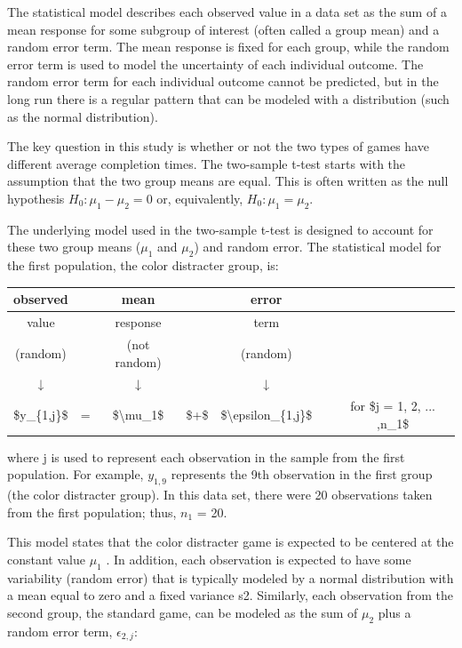 \documentclass[
]{report}
\begin{document}
The statistical model describes each observed value in a data set as the sum of a mean response for some subgroup of interest (often called a group mean) and a random error term. The mean response is fixed for each group, while the random error term is used to model the uncertainty of each individual outcome. The random error term for each individual outcome cannot be predicted, but in the long run there is a regular pattern that can be modeled with a distribution (such as the normal distribution).

The key question in this study is whether or not the two types of games have different average completion times. The two-sample t-test starts with the assumption that the two group means are equal. This is often written as the null hypothesis \(H_0 : \mu_1 - \mu_2 = 0\) or, equivalently, \(H_0 : \mu_1 = \mu_2\).

The underlying model used in the two-sample t-test is designed to account for these two group means (\(\mu_1\) and \(\mu_2\)) and random error. The statistical model for the first population, the color distracter group, is:

\begin{table}
\centering
\begin{tabular}{>{}c|>{}c|>{}c|>{}c|>{}c|>{}c|>{}c}
\hline
observed &  & mean &  & error &  & \\
\hline
value &  & response &  & term &  & \\
\hline
(random) &  & (not random) &  & (random) &  & \\
\hline
↓ &  & ↓ &  & ↓ &  & \\
\hline
\$y\_\{1,j\}\$ & = & \$\textbackslash{}mu\_1\$ & \$+\$ & \$\textbackslash{}epsilon\_\{1,j\}\$ &  & for \$j = 1, 2, ... ,n\_1\$\\
\hline
\end{tabular}
\end{table}

where j is used to represent each observation in the sample from the first population. For example, \(y_{1, 9}\) represents the 9th observation in the first group (the color distracter group). In this data set, there were 20 observations taken from the first population; thus, \(n_1\) = 20.

This model states that the color distracter game is expected to be centered at the constant value \(\mu_1\) . In addition, each observation is expected to have some variability (random error) that is typically modeled by a normal distribution with a mean equal to zero and a fixed variance s2. Similarly, each observation from the second group, the standard game, can be modeled as the sum of \(\mu_2\) plus a random error term, \(\epsilon_{2, j}\):
\end{document}
